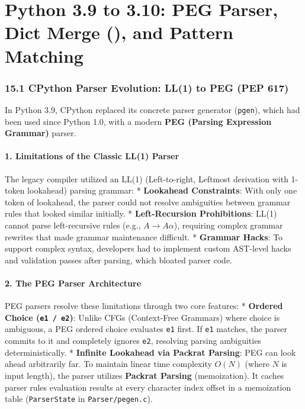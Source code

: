 \hypertarget{python-3.9-to-3.10-peg-parser-dict-merge-and-pattern-matching}{%
\chapter{Python 3.9 to 3.10: PEG Parser, Dict Merge (\textbar), and
Pattern
Matching}\label{python-3.9-to-3.10-peg-parser-dict-merge-and-pattern-matching}}

\hypertarget{cpython-parser-evolution-ll1-to-peg-pep-617}{%
\subsection{15.1 CPython Parser Evolution: LL(1) to PEG (PEP
617)}\label{cpython-parser-evolution-ll1-to-peg-pep-617}}

In Python 3.9, CPython replaced its concrete parser generator
(\passthrough{\lstinline!pgen!}), which had been used since Python 1.0,
with a modern \textbf{PEG (Parsing Expression Grammar)} parser.

\hypertarget{limitations-of-the-classic-ll1-parser}{%
\subsubsection{1. Limitations of the Classic LL(1)
Parser}\label{limitations-of-the-classic-ll1-parser}}

The legacy compiler utilized an LL(1) (Left-to-right, Leftmost
derivation with 1-token lookahead) parsing grammar: * \textbf{Lookahead
Constraints}: With only one token of lookahead, the parser could not
resolve ambiguities between grammar rules that looked similar initially.
* \textbf{Left-Recursion Prohibitions}: LL(1) cannot parse
left-recursive rules (e.g., \(A \to A \alpha\)), requiring complex
grammar rewrites that made grammar maintenance difficult. *
\textbf{Grammar Hacks}: To support complex syntax, developers had to
implement custom AST-level hacks and validation passes after parsing,
which bloated parser code.

\hypertarget{the-peg-parser-architecture}{%
\subsubsection{2. The PEG Parser
Architecture}\label{the-peg-parser-architecture}}

PEG parsers resolve these limitations through two core features: *
\textbf{Ordered Choice (\passthrough{\lstinline!e1 / e2!})}: Unlike CFGs
(Context-Free Grammars) where choice is ambiguous, a PEG ordered choice
evaluates \passthrough{\lstinline!e1!} first. If
\passthrough{\lstinline!e1!} matches, the parser commits to it and
completely ignores \passthrough{\lstinline!e2!}, resolving parsing
ambiguities deterministically. * \textbf{Infinite Lookahead via Packrat
Parsing}: PEG can look ahead arbitrarily far. To maintain linear time
complexity \(O(N)\) (where \(N\) is input length), the parser utilizes
\textbf{Packrat Parsing} (memoization). It caches parser rules
evaluation results at every character index offset in a memoization
table (\passthrough{\lstinline!ParserState!} in
\passthrough{\lstinline!Parser/pegen.c!}).

